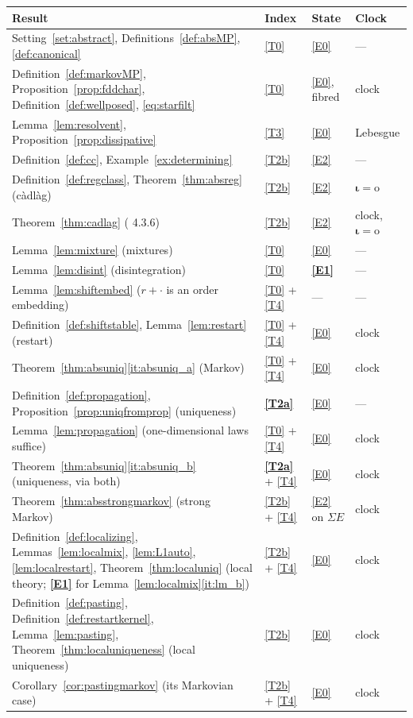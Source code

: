 \documentclass[11pt,a4paper]{article}
\theoremstyle{plain}
\theoremstyle{definition}
\theoremstyle{remark}
\newcommand{\EK}{\cite{EK86}}
\begin{document}
\medskip
\noindent
\begin{tabular}{@{}p{}p{}p{}p{}@{}}
\toprule
\textbf{Result} & \textbf{Index} & \textbf{State} & \textbf{Clock} \\
\midrule
Setting~\ref{set:abstract}, Definitions~\ref{def:absMP}, \ref{def:canonical}
  & \eqref{T0} & \eqref{E0} & --- \\
Definition~\ref{def:markovMP}, Proposition~\ref{prop:fddchar},
  Definition~\ref{def:wellposed}, \eqref{eq:starfilt}
  & \eqref{T0} & \eqref{E0}, fibred & clock \\
Lemma~\ref{lem:resolvent}, Proposition~\ref{prop:dissipative}
  & \eqref{T3} & \eqref{E0} & Lebesgue \\
Definition~\ref{def:cc}, Example~\ref{ex:determining}
  & \eqref{T2b} & \eqref{E2} & --- \\
\midrule
Definition~\ref{def:regclass}, Theorem~\ref{thm:absreg} (c\`adl\`ag)
  & \eqref{T2b} & \eqref{E2} & $\boldsymbol{\iota = \mathrm{o}}$ \\
Theorem~\ref{thm:cadlag} (\EK{} 4.3.6)
  & \eqref{T2b} & \eqref{E2} & clock, $\boldsymbol{\iota = \mathrm{o}}$ \\
\midrule
Lemma~\ref{lem:mixture} (mixtures)
  & \eqref{T0} & \eqref{E0} & --- \\
Lemma~\ref{lem:disint} (disintegration)
  & \eqref{T0} & \textbf{\eqref{E1}} & --- \\
Lemma~\ref{lem:shiftembed} ($r + \cdot$ is an order embedding)
  & \eqref{T0} + \eqref{T4} & --- & --- \\
Definition~\ref{def:shiftstable}, Lemma~\ref{lem:restart} (restart)
  & \eqref{T0} + \eqref{T4} & \eqref{E0} & clock \\
Theorem~\ref{thm:absuniq}\ref{it:absuniq_a} (Markov)
  & \eqref{T0} + \eqref{T4} & \eqref{E0} & clock \\
Definition~\ref{def:propagation}, Proposition~\ref{prop:uniqfromprop}
  (uniqueness)
  & \textbf{\eqref{T2a}} & \eqref{E0} & --- \\
Lemma~\ref{lem:propagation} (one-dimensional laws suffice)
  & \eqref{T0} + \eqref{T4} & \eqref{E0} & clock \\
Theorem~\ref{thm:absuniq}\ref{it:absuniq_b} (uniqueness, via both)
  & \textbf{\eqref{T2a}} + \eqref{T4} & \eqref{E0} & clock \\
Theorem~\ref{thm:absstrongmarkov} (strong Markov)
  & \eqref{T2b} + \eqref{T4} & \eqref{E2} on $\Sigma E$ & clock \\
Definition~\ref{def:localizing}, Lemmas~\ref{lem:localmix},
  \ref{lem:L1auto}, \ref{lem:localrestart},
  Theorem~\ref{thm:localuniq} (local theory; \textbf{\eqref{E1}} for
  Lemma~\ref{lem:localmix}\ref{it:lm_b})
  & \eqref{T2b} + \eqref{T4} & \eqref{E0} & clock \\
Definition~\ref{def:pasting}, Definition~\ref{def:restartkernel},
  Lemma~\ref{lem:pasting}, Theorem~\ref{thm:localuniqueness}
  (local uniqueness)
  & \eqref{T2b} & \eqref{E0} & clock \\
Corollary~\ref{cor:pastingmarkov} (its Markovian case)
  & \eqref{T2b} + \eqref{T4} & \eqref{E0} & clock \\
\bottomrule
\end{tabular}
\end{document}
